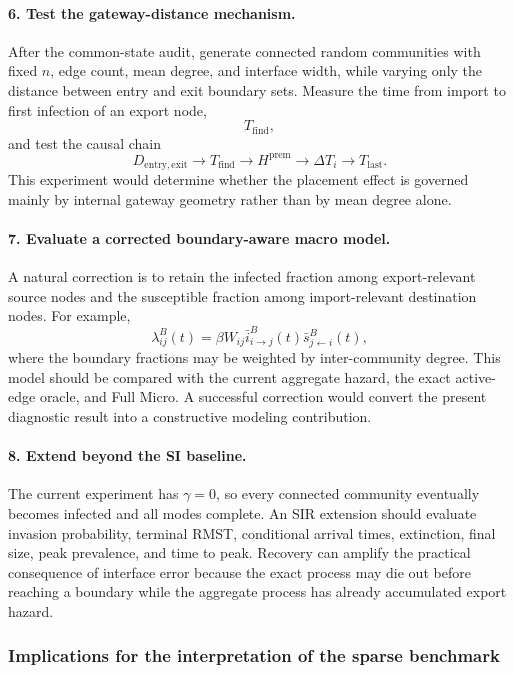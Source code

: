 \paragraph{6. Test the gateway-distance mechanism.}
After the common-state audit, generate connected random communities with fixed $n$, edge count, mean degree, and interface width, while varying only the distance between entry and exit boundary sets.  Measure the time from import to first infection of an export node,
\[
T_{\mathrm{find}},
\]
and test the causal chain
\[
D_{\mathrm{entry,exit}}
\longrightarrow
T_{\mathrm{find}}
\longrightarrow
H^{\mathrm{prem}}
\longrightarrow
\Delta T_i
\longrightarrow
T_{\mathrm{last}}.
\]
This experiment would determine whether the placement effect is governed mainly by internal gateway geometry rather than by mean degree alone.

\paragraph{7. Evaluate a corrected boundary-aware macro model.}
A natural correction is to retain the infected fraction among export-relevant source nodes and the susceptible fraction among import-relevant destination nodes.  For example,
\begin{equation}
    \lambda^{B}_{ij}(t)
    =
    \beta W_{ij}
    \bar{i}^{B}_{i\to j}(t)
    \bar{s}^{B}_{j\leftarrow i}(t),
    \label{eq:boundary_corrected_hazard}
\end{equation}
where the boundary fractions may be weighted by inter-community degree.  This model should be compared with the current aggregate hazard, the exact active-edge oracle, and Full Micro.  A successful correction would convert the present diagnostic result into a constructive modeling contribution.

\paragraph{8. Extend beyond the SI baseline.}
The current experiment has $\gamma=0$, so every connected community eventually becomes infected and all modes complete.  An SIR extension should evaluate invasion probability, terminal RMST, conditional arrival times, extinction, final size, peak prevalence, and time to peak.  Recovery can amplify the practical consequence of interface error because the exact process may die out before reaching a boundary while the aggregate process has already accumulated export hazard.

\subsubsection{Implications for the interpretation of the sparse benchmark}
\label{sec:hazard_placement_implications}

